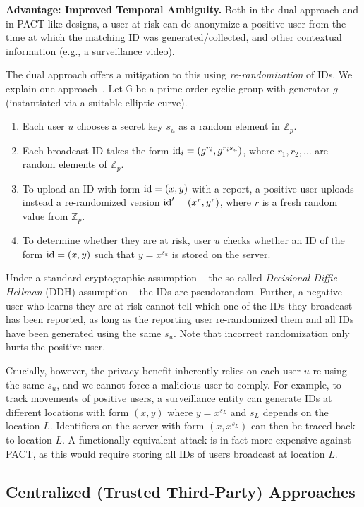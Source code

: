 \documentclass{article}
\begin{document}
{\bf Advantage: Improved Temporal Ambiguity.} Both in the dual approach and in PACT-like designs, a user at risk can de-anonymize a positive user from the time at which the matching ID was generated/collected, and other contextual information (e.g., a surveillance video). 

The dual approach offers a mitigation to this using {\em re-randomization} of IDs. We explain one approach~\cite{yael}. Let $\mathbb{G}$ be a prime-order cyclic group with generator $g$ (instantiated via a suitable elliptic curve). 
\begin{enumerate}
    \item Each user $u$ chooses a secret key $s_u$ as a random element in $\mathbb{Z}_p$.
    \item Each broadcast ID takes the form $\mathrm{id}_i = (g^{r_i}, g^{r_i s_u})$, where $r_1, r_2, \ldots$ are random elements of $\mathbb{Z}_p$.
    \item To upload an ID with form $\mathrm{id} = (x, y)$ with a report, a positive user uploads instead a re-randomized version $\mathrm{id}' = (x^r, y^r)$, where $r$ is a fresh random value from $\mathbb{Z}_p$.
    \item To determine whether they are at risk, user $u$ checks whether an ID of the form $\mathrm{id} = (x,y)$ such that $y = x^{s_u}$ is stored on the server.
\end{enumerate}
Under a standard cryptographic assumption -- the so-called {\em Decisional Diffie-Hellman} (DDH) assumption -- the IDs are pseudorandom. Further, a negative user who learns they are at risk cannot tell which one of the IDs they broadcast has been reported, as long as the reporting user re-randomized them and all IDs have been generated using the same $s_u$. Note that incorrect randomization only hurts the positive user.

Crucially, however, the privacy benefit inherently relies on each user $u$ re-using the same $s_u$, and we cannot force a malicious user to comply. For example, to track movements of positive users, a surveillance entity can generate IDs at different locations with form $(x,y)$ where $y = x^{s_L}$ and $s_L$ depends on the location $L$. Identifiers on the server with form $(x, x^{s_L})$ can then be traced back to location $L$. A functionally equivalent attack is in fact more expensive against PACT, as this would require storing all IDs of users broadcast at location $L$.  


\subsection{Centralized (Trusted Third-Party) Approaches}\label{sect:centr}
\end{document}
